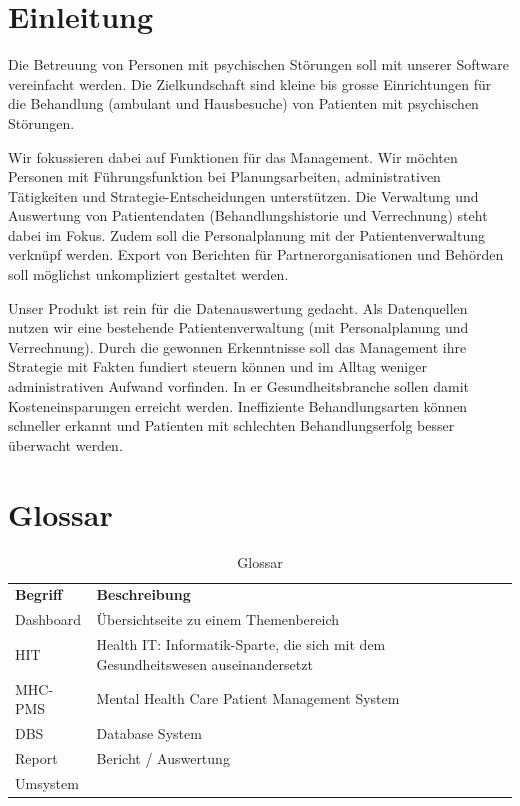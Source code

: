 \documentclass[a4paper]{scrreprt}
\begin{document}
\chapter{Einleitung}

Die Betreuung von Personen mit psychischen Störungen soll mit unserer Software vereinfacht werden. Die Zielkundschaft sind kleine bis grosse Einrichtungen für die Behandlung (ambulant und Hausbesuche) von Patienten mit psychischen Störungen.

Wir fokussieren dabei auf Funktionen für das Management. Wir möchten Personen mit Führungsfunktion bei Planungsarbeiten, administrativen Tätigkeiten und Strategie-Entscheidungen unterstützen. Die Verwaltung und Auswertung von Patientendaten (Behandlungshistorie und Verrechnung) steht dabei im Fokus. Zudem soll die Personalplanung mit der Patientenverwaltung verknüpf werden. Export von Berichten für Partnerorganisationen und Behörden soll möglichst unkompliziert gestaltet werden.

\bigskip

Unser Produkt ist rein für die Datenauswertung gedacht. Als Datenquellen nutzen wir eine bestehende Patientenverwaltung (mit Personalplanung und Verrechnung). Durch die gewonnen Erkenntnisse soll das Management ihre Strategie mit Fakten fundiert steuern können und im Alltag weniger administrativen Aufwand vorfinden. In er Gesundheitsbranche sollen damit Kosteneinsparungen erreicht werden. Ineffiziente Behandlungsarten können schneller erkannt und Patienten mit schlechten Behandlungserfolg besser überwacht werden.



\chapter{Glossar}
\begin{table}[h]
\label{tab_glossar}
\begin{tabular}{llll}
{\textbf{Begriff}} 	& {\textbf{Beschreibung}} \\

Dashboard			& Übersichtseite zu einem Themenbereich \\
HIT 				& Health IT: Informatik-Sparte, die sich mit dem Gesundheitswesen auseinandersetzt \\
MHC-PMS 			& Mental Health Care Patient Management System \\
DBS 				& Database System \\
Report				& Bericht / Auswertung \\
Umsystem			&  	%


\end{tabular}
\caption[Glossar]{Glossar}
\end{table}
\end{document}
